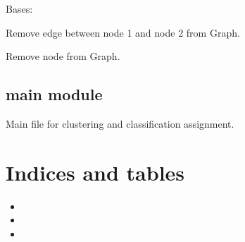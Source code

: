\documentclass[letterpaper,10pt,english]{sphinxmanual}
\begin{document}
\begin{fulllineitems}
\label{\detokenize{Graph:Graph.Graph}}
\sphinxAtStartPar
Bases: 

\begin{fulllineitems}
\label{\detokenize{Graph:Graph.Graph.removeEdge}}
\sphinxAtStartPar
Remove edge between node 1 and node 2 from Graph.

\end{fulllineitems}


\begin{fulllineitems}
\label{\detokenize{Graph:Graph.Graph.removeNode}}
\sphinxAtStartPar
Remove node from Graph.

\end{fulllineitems}


\end{fulllineitems}



\section{main module}
\label{\detokenize{main:module-main}}\label{\detokenize{main:main-module}}\label{\detokenize{main::doc}}
\sphinxAtStartPar
Main file for clustering and classification assignment.


\chapter{Indices and tables}
\label{\detokenize{index:indices-and-tables}}\begin{itemize}
\item {} 
\sphinxAtStartPar
{}

\item {} 
\sphinxAtStartPar
{}

\item {} 
\sphinxAtStartPar
{}

\end{itemize}
\end{document}
